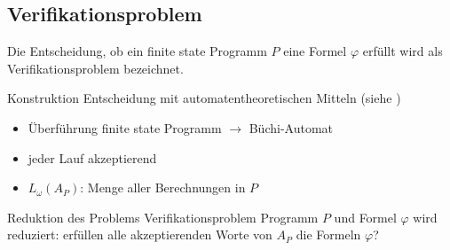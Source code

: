 \subsection{Verifikationsproblem}
\begin{frame}{\insertsubsection}
    Die Entscheidung, ob ein finite state Programm $P$ eine Formel $\varphi$ erfüllt wird als {Verifikationsproblem} bezeichnet.
    \begin{block}{Konstruktion}
        Entscheidung mit automatentheoretischen Mitteln (siehe \cite[kap. 4.2]{vardi+96})
        \begin{itemize}
            \item Überführung finite state Programm $\rightarrow$ Büchi-Automat
            \item jeder Lauf akzeptierend
            \item $L_\omega(A_P)$: Menge aller Berechnungen in $P$
        \end{itemize} 
    \end{block}
    \begin{block}{Reduktion des Problems}
        Verifikationsproblem Programm $P$ und Formel $\varphi$ wird reduziert:
        erfüllen alle akzeptierenden Worte von $A_P$ die Formeln $\varphi$?
    \end{block}
\end{frame}